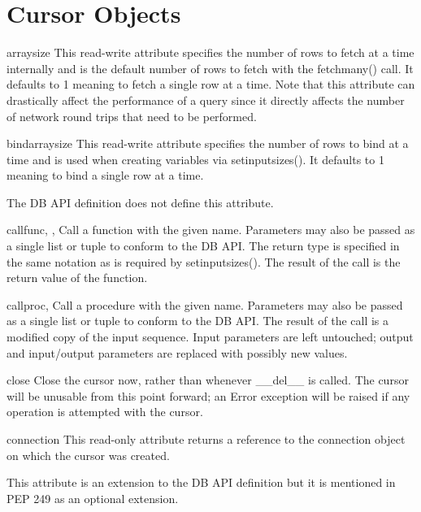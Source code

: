 \documentclass{manual}
\begin{document}
\chapter{Cursor Objects\label{cursorobj}}

\begin{datadesc}{arraysize}
  This read-write attribute specifies the number of rows to fetch at a time
  internally and is the default number of rows to fetch with the fetchmany()
  call. It defaults to 1 meaning to fetch a single row at a time. Note that
  this attribute can drastically affect the performance of a query since it
  directly affects the number of network round trips that need to be performed.
\end{datadesc}

\begin{datadesc}{bindarraysize}
  This read-write attribute specifies the number of rows to bind at a time and
  is used when creating variables via setinputsizes(). It defaults to 1 meaning
  to bind a single row at a time.

   The DB API definition does not define this attribute.
\end{datadesc}

\begin{funcdesc}{callfunc}{, , }
  Call a function with the given name. Parameters may also be passed as a
  single list or tuple to conform to the DB API. The return type is specified
  in the same notation as is required by setinputsizes(). The result of the
  call is the return value of the function.
\end{funcdesc}

\begin{funcdesc}{callproc}{, }
  Call a procedure with the given name. Parameters may also be passed as a
  single list or tuple to conform to the DB API. The result of the call is a
  modified copy of the input sequence. Input parameters are left untouched;
  output and input/output parameters are replaced with possibly new values.
\end{funcdesc}

\begin{funcdesc}{close}{}
  Close the cursor now, rather than whenever __del__ is called. The cursor will
  be unusable from this point forward; an Error exception will be raised if any
  operation is attempted with the cursor.
\end{funcdesc}

\begin{datadesc}{connection}
  This read-only attribute returns a reference to the connection object on
  which the cursor was created.

   This attribute is an extension to the DB API definition but it
  is mentioned in PEP 249 as an optional extension.
\end{datadesc}
\end{document}
